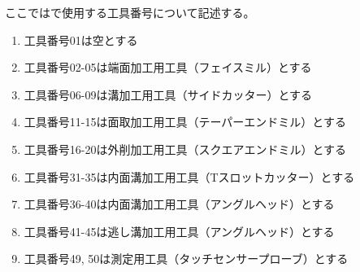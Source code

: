 


ここでは\DMname で使用する工具番号について記述する。
\begin{enumerate}[label=\Roman*), ref=\Roman*)]
\item 工具番号01は空とする
\item 工具番号02-05は端面加工用工具（フェイスミル）とする
\item 工具番号06-09は溝加工用工具（サイドカッター）とする
\item 工具番号11-15は面取加工用工具（テーパーエンドミル）とする
\item 工具番号16-20は外削加工用工具（スクエアエンドミル）とする
\item 工具番号31-35は内面溝加工用工具（Tスロットカッター）とする
\item 工具番号36-40は内面溝加工用工具（アングルヘッド）とする
\item 工具番号41-45は逃し溝加工用工具（アングルヘッド）とする
\item 工具番号49, 50は測定用工具（タッチセンサープローブ）とする
\end{enumerate}



